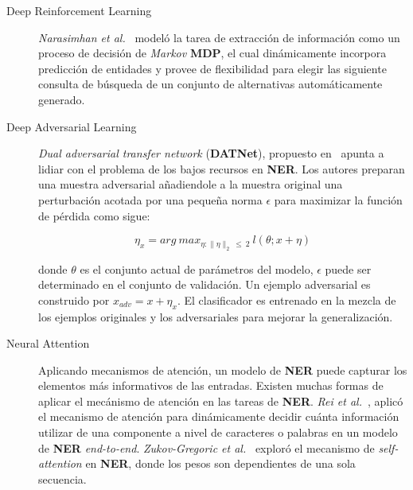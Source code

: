 \begin{description}
	\item[Deep Reinforcement Learning] \emph{Narasimhan et al.}~\cite{narasimhan2016improving} model\'o la tarea de extracci\'on de informaci\'on como un proceso de decisi\'on de \emph{Markov} \textbf{MDP}, el cual din\'amicamente incorpora predicci\'on de entidades y provee de flexibilidad para elegir las siguiente consulta de b\'usqueda de un conjunto de alternativas autom\'aticamente generado.
	
	\item[Deep Adversarial Learning] \emph{Dual adversarial transfer network} (\textbf{DATNet}), propuesto en~\cite{zhou2018datnet} apunta a lidiar con el problema de los bajos recursos en \textbf{NER}. Los autores preparan una muestra adversarial a\~nadiendole a la muestra original una perturbaci\'on acotada por una peque\~na norma $\epsilon$ para maximizar la funci\'on de p\'erdida como sigue:
	
	\begin{equation}
	\eta_x = arg \ max_{\eta:\lVert \eta \rVert_2 \ \leq \ 2 } \ l(\theta; x + \eta)
	\end{equation}
	
	donde $\theta$ es el conjunto actual de par\'ametros del modelo, $\epsilon$ puede ser determinado en el conjunto de validaci\'on. Un ejemplo adversarial es construido por $x_{adv} = x + \eta_x$. El clasificador es entrenado en la mezcla de los ejemplos originales y los adversariales para mejorar la generalizaci\'on.
	
	\item[Neural Attention] Aplicando mecanismos de atenci\'on, un modelo de \textbf{NER} puede capturar los elementos m\'as informativos de las entradas. Existen muchas formas de aplicar el mec\'anismo de atenci\'on en las tareas de \textbf{NER}. \emph{Rei et al.}~\cite{rei2016attending}, aplic\'o el mecanismo de atenci\'on para din\'amicamente decidir cu\'anta informaci\'on utilizar de una componente a nivel de caracteres o palabras en un modelo de \textbf{NER} \emph{end-to-end}. \emph{Zukov-Gregoric et al.}~\cite{zukov2017neural} explor\'o el mecanismo de \emph{self-attention} en \textbf{NER}, donde los pesos son dependientes de una sola secuencia.
\end{description}








